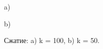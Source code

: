 \documentclass[a5paper, 10pt]{article}
\theoremstyle{definition}
\theoremstyle{plain}
\theoremstyle{remark}
\begin{document}
\begin{figure}[h]
\begin{minipage}[h]{1\linewidth}
 a) \\
\end{minipage}
\begin{minipage}[h]{1\linewidth}
 b) \\
\end{minipage}
\caption{Сжатие: a) k = 100, b) k = 50.}
\end{figure}
\end{document}

